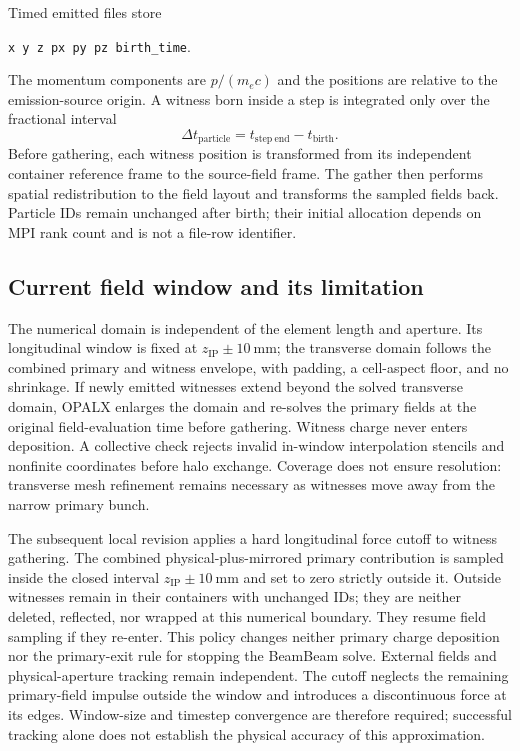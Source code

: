 \documentclass[11pt,a4paper]{article}
\newcommand{\code}[1]{\texttt{#1}}
\begin{document}
Timed emitted files store
\begin{center}
  \code{x y z px py pz birth\_time}.
\end{center}
The momentum components are $p/(m_ec)$ and the positions are relative to the
emission-source origin.  A witness born inside a step is integrated only over
the fractional interval
\begin{equation}
  \Delta t_{\mathrm{particle}}=t_{\mathrm{step\ end}}-t_{\mathrm{birth}}.
\end{equation}
Before gathering, each witness position is transformed from its independent
container reference frame to the source-field frame.  The gather then performs
spatial redistribution to the field layout and transforms the sampled fields back.
Particle IDs remain unchanged after birth; their initial allocation depends on
MPI rank count and is not a file-row identifier.

\subsection{Current field window and its limitation}

The numerical domain is independent of the element length and aperture.
Its longitudinal window is fixed at $z_{\mathrm{IP}}\pm\SI{10}{\milli\metre}$;
the transverse domain follows the combined primary and witness envelope,
with padding, a cell-aspect floor, and no shrinkage.  If newly emitted witnesses
extend beyond the solved transverse domain, OPALX enlarges the domain and
re-solves the primary fields at the original field-evaluation time before
gathering.  Witness charge never enters deposition.  A collective check rejects
invalid in-window interpolation stencils and nonfinite coordinates before halo
exchange.  Coverage does not
ensure resolution: transverse mesh refinement remains necessary as witnesses
move away from the narrow primary bunch.

The subsequent local revision applies a hard longitudinal force cutoff to
witness gathering.  The combined
physical-plus-mirrored primary contribution is sampled inside the closed
interval $z_{\mathrm{IP}}\pm\SI{10}{\milli\metre}$ and set to zero strictly
outside it.  Outside witnesses remain in their containers with unchanged IDs;
they are neither deleted, reflected, nor wrapped at this numerical boundary.
They resume field sampling if they re-enter.  This policy changes neither
primary charge deposition nor the primary-exit rule for stopping the BeamBeam
solve.  External fields and physical-aperture tracking remain independent.
The cutoff neglects the remaining primary-field impulse outside the window
and introduces a discontinuous force at its edges.  Window-size and timestep
convergence are therefore required; successful tracking alone does not
establish the physical accuracy of this approximation.
\end{document}
